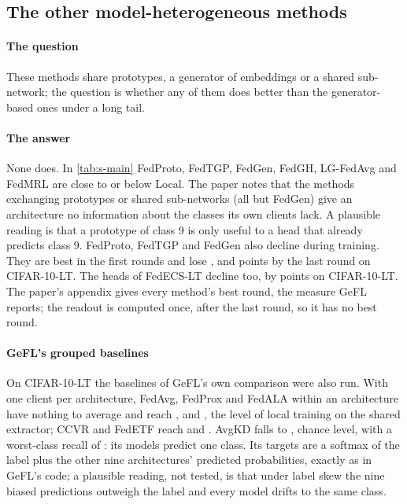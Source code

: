 \subsection{The other model-heterogeneous methods}

\paragraph{The question} These methods share prototypes, a generator of embeddings or a shared sub-network; the
question is whether any of them does better than the generator-based ones under a long tail.

\paragraph{The answer} None does. In \cref{tab:s-main} FedProto, FedTGP, FedGen, FedGH, LG-FedAvg and FedMRL are close
to or below Local. The paper notes that the methods exchanging prototypes or shared sub-networks (all but FedGen) give
an architecture no information about the classes its own clients lack. A plausible reading is that a prototype of
class 9 is only useful to a head that already predicts class 9. FedProto, FedTGP and FedGen also decline during
training. They are best in the first rounds and lose ,
 and  points by the last round on CIFAR-10-LT. The
heads of FedECS-LT decline too, by  points on CIFAR-10-LT. The paper's
appendix gives every method's best round, the measure GeFL reports; the readout is computed once, after the last round,
so it has no best round.

\paragraph{GeFL's grouped baselines} On CIFAR-10-LT the baselines of GeFL's own comparison were also run. With one
client per architecture, FedAvg, FedProx and FedALA within an architecture have nothing to average and reach
,  and , the level of local
training on the shared extractor; CCVR and FedETF reach  and .
AvgKD falls to , chance level, with a worst-class recall of :
its models predict one class. Its targets are a softmax of the label plus the other nine architectures' predicted
probabilities, exactly as in GeFL's code; a plausible reading, not tested, is that under label skew the nine biased
predictions outweigh the label and every model drifts to the same class.

